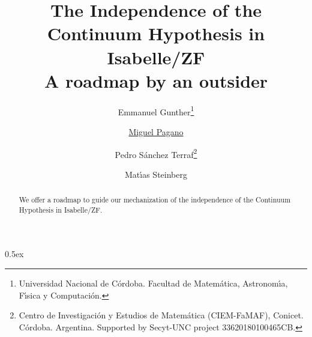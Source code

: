 \documentclass[11pt,a4paper,english]{article}
\begin{document}
\title{The Independence of the Continuum Hypothesis in Isabelle/ZF\\
A roadmap by an outsider}
\author{Emmanuel Gunther\thanks{Universidad Nacional de C\'ordoba. 
    Facultad de Matem\'atica, Astronom\'{\i}a,  F\'{\i}sica y
    Computaci\'on.}
  \and
  \underline{Miguel Pagano}\footnotemark[1]
  \and
  Pedro S\'anchez Terraf\footnotemark[1] \thanks{Centro de Investigaci\'on y Estudios de Matem\'atica
    (CIEM-FaMAF), Conicet. C\'ordoba. Argentina.
    Supported by Secyt-UNC project 33620180100465CB.}
  \and
  Mat\'{\i}as Steinberg\footnotemark[1]
}
\maketitle

\begin{abstract}
We offer a roadmap to guide our mechanization of the independence of
the Continuum Hypothesis in Isabelle/ZF.
\end{abstract}


\tableofcontents

\parindent 0pt\parskip 0.5ex





\end{document}
